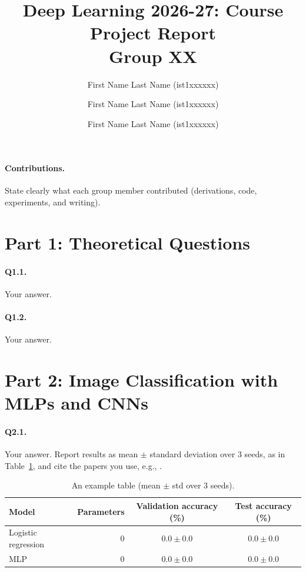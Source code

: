 \documentclass[11pt,a4paper]{article}
\title{Deep Learning 2026-27: Course Project Report \\ \large Group XX}
\author{
  First Name Last Name (ist1xxxxxx) \and
  First Name Last Name (ist1xxxxxx) \and
  First Name Last Name (ist1xxxxxx)
}
\date{}
\begin{document}
\maketitle

\paragraph{Contributions.}
State clearly what each group member contributed (derivations, code, experiments, and writing).

\section*{Part 1: Theoretical Questions}

\paragraph{Q1.1.} Your answer.

\paragraph{Q1.2.} Your answer.


\section*{Part 2: Image Classification with MLPs and CNNs}

\paragraph{Q2.1.}
Your answer. Report results as mean $\pm$ standard deviation over 3 seeds, as in Table~\ref{tab:example}, and cite the papers you use, e.g., \citet{vinyals2015show}.

\begin{table}[ht]
\centering
\begin{tabular}{lrcc}
\toprule
Model & Parameters & Validation accuracy (\%) & Test accuracy (\%) \\
\midrule
Logistic regression & 0 & $0.0 \pm 0.0$ & $0.0 \pm 0.0$ \\
MLP & 0 & $0.0 \pm 0.0$ & $0.0 \pm 0.0$ \\
\bottomrule
\end{tabular}
\caption{An example table (mean $\pm$ std over 3 seeds).}
\label{tab:example}
\end{table}

\end{document}
